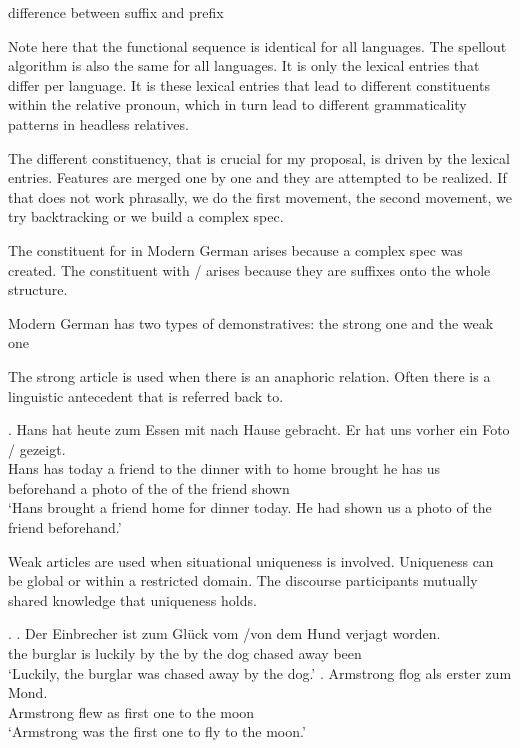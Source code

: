 difference between suffix and prefix

Note here that the functional sequence is identical for all languages. The spellout algorithm is also the same for all languages. It is only the lexical entries that differ per language. It is these lexical entries that lead to different constituents within the relative pronoun, which in turn lead to different grammaticality patterns in headless relatives.

The different constituency, that is crucial for my proposal, is driven by the lexical entries. Features are merged one by one and they are attempted to be realized. If that does not work phrasally, we do the first movement, the second movement, we try backtracking or we build a complex spec.

The constituent for  in Modern German arises because a complex spec was created. The constituent with / arises because they are suffixes onto the whole structure.





Modern German has two types of demonstratives: the strong one and the weak one

The strong article is used when there is an anaphoric relation. Often there is a linguistic antecedent that is referred back to.

\exg. Hans hat heute   zum Essen mit nach Hause gebracht. Er hat uns vorher ein Foto /    gezeigt.\\
Hans has today a friend {to the} dinner with to home brought he has us beforehand a photo {of the} of the friend shown\\
`Hans brought a friend home for dinner today. He had shown us a photo of the friend beforehand.'

Weak articles are used when situational uniqueness is involved. Uniqueness can be global or within a restricted domain. The discourse participants mutually shared knowledge that uniqueness holds.

\ex.
\ag. Der Einbrecher ist {zum Glück} vom /von dem Hund verjagt worden.\\
the burglar is luckily {by the} by the dog {chased away} been\\
`Luckily, the burglar was chased away by the dog.'
\bg. Armstrong flog als erster zum Mond.\\
Armstrong flew as {first one} {to the} moon\\
`Armstrong was the first one to fly to the moon.' 



